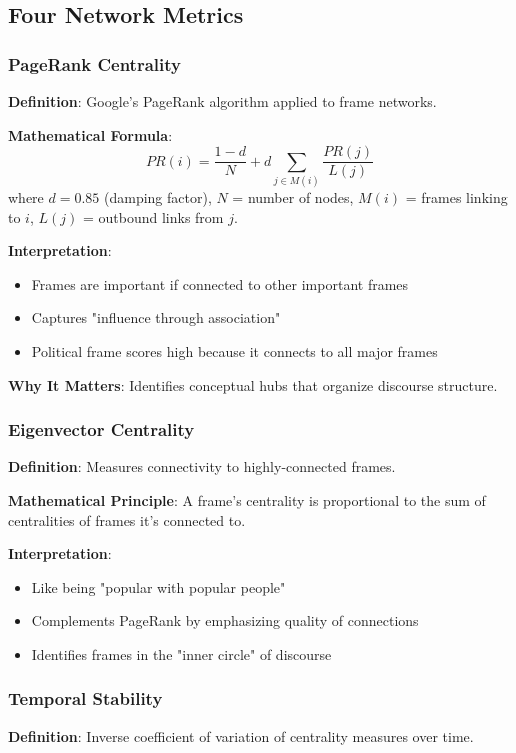 \documentclass[11pt]{article}
\begin{document}
\subsection{Four Network Metrics}

\subsubsection{PageRank Centrality}
\textbf{Definition}: Google's PageRank algorithm applied to frame networks.

\textbf{Mathematical Formula}:
$$PR(i) = \frac{1-d}{N} + d \sum_{j \in M(i)} \frac{PR(j)}{L(j)}$$
where $d=0.85$ (damping factor), $N$ = number of nodes, $M(i)$ = frames linking to $i$, $L(j)$ = outbound links from $j$.

\textbf{Interpretation}:
\begin{itemize}
    \item Frames are important if connected to other important frames
    \item Captures "influence through association"
    \item Political frame scores high because it connects to all major frames
\end{itemize}

\textbf{Why It Matters}: Identifies conceptual hubs that organize discourse structure.

\subsubsection{Eigenvector Centrality}
\textbf{Definition}: Measures connectivity to highly-connected frames.

\textbf{Mathematical Principle}:
A frame's centrality is proportional to the sum of centralities of frames it's connected to.

\textbf{Interpretation}:
\begin{itemize}
    \item Like being "popular with popular people"
    \item Complements PageRank by emphasizing quality of connections
    \item Identifies frames in the "inner circle" of discourse
\end{itemize}

\subsubsection{Temporal Stability}
\textbf{Definition}: Inverse coefficient of variation of centrality measures over time.
\end{document}
